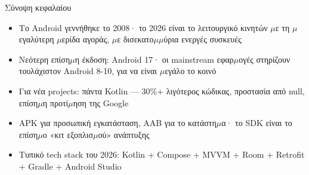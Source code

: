 \begin{tcbsummary}{Σύνοψη κεφαλαίου}
\begin{itemize}
  \item Το Android γεννήθηκε το 2008· το 2026 είναι το λειτουργικό κινητών $\mu$ε τη $\mu$εγαλύτερη $\mu$ερίδα αγοράς, $\mu$ε δισεκατο$\mu$$\mu$ύρια ενεργές συσκευές
  \item Νεότερη επίση$\mu$η έκδοση: Android 17· οι mainstream εφαρ$\mu$ογές στηρίζουν τουλάχιστον Android 8-10, για να είναι $\mu$εγάλο το κοινό
  \item Για νέα projects: πάντα Kotlin — 30\%+ λιγότερος κώδικας, προστασία από null, επίση$\mu$η προτί$\mu$ηση της Google
  \item APK για προσωπική εγκατάσταση, AAB για το κατάστη$\mu$α· το SDK είναι το επίση$\mu$ο «κιτ εξοπλισ$\mu$ού» ανάπτυξης
  \item Τυπικό tech stack του 2026: Kotlin + Compose + MVVM + Room + Retrofit + Gradle + Android Studio
\end{itemize}

\end{tcbsummary}
